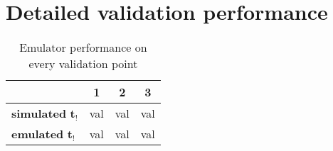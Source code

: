\section{Detailed validation performance}

\begin{table}[htpb]
  \centering
  \caption{Emulator performance on every validation point}
  \label{tab:}
  \begin{tabular}{lccc}
    \toprule
     & \textbf{1} & \textbf{2} & \textbf{3}\\
    \midrule
    \textbf{simulated} $\bm{t_!}$ & val & val & val \\
    \textbf{emulated} $\bm{t_!}$ & val & val & val \\
    \bottomrule
  \end{tabular}
\end{table}



